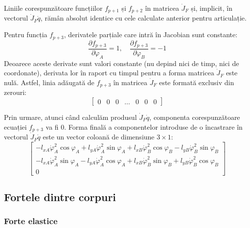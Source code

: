 \documentclass[12pt, a4paper]{article}
\begin{document}
Liniile corespunzătoare funcțiilor $f_{p+1}$ și $f_{p+2}$ în matricea $\dot{J}_F$ și, implicit, în vectorul $\dot{J}_F \dot{q}$, rămân absolut identice cu cele calculate anterior pentru articulație. 

Pentru funcția $f_{p+3}$, derivatele parțiale care intră în Jacobian sunt constante:
\begin{equation}
    \frac{\partial f_{p+3}}{\partial \varphi_A} = 1, \quad \frac{\partial f_{p+3}}{\partial \varphi_B} = -1
\end{equation}
Deoarece aceste derivate sunt valori constante (nu depind nici de timp, nici de coordonate), derivata lor în raport cu timpul pentru a forma matricea $\dot{J}_F$ este nulă. Astfel, linia adăugată de $f_{p+3}$ în matricea $\dot{J}_F$ este formată exclusiv din zerouri:
\begin{equation}
    \begin{bmatrix}
        0 & 0 & 0 & \dots & 0 & 0 & 0
    \end{bmatrix}
\end{equation}

Prin urmare, atunci când calculăm produsul $\dot{J}_F \dot{q}$, componenta corespunzătoare ecuației $f_{p+3}$ va fi $0$. Forma finală a componentelor introduse de o încastrare în vectorul $\dot{J}_F \dot{q}$ este un vector coloană de dimensiune $3 \times 1$:
\begin{equation}
    \begin{bmatrix}
        -l_{xA}\dot{\varphi}_A^2\cos\varphi_A + l_{yA}\dot{\varphi}_A^2\sin\varphi_A + l_{xB}\dot{\varphi}_B^2\cos\varphi_B - l_{yB}\dot{\varphi}_B^2\sin\varphi_B \\
        -l_{xA}\dot{\varphi}_A^2\sin\varphi_A - l_{yA}\dot{\varphi}_A^2\cos\varphi_A + l_{xB}\dot{\varphi}_B^2\sin\varphi_B + l_{yB}\dot{\varphi}_B^2\cos\varphi_B \\
        0
    \end{bmatrix}
\end{equation}

\subsection{Fortele dintre corpuri}
\subsubsection{Forte elastice}
\end{document}
